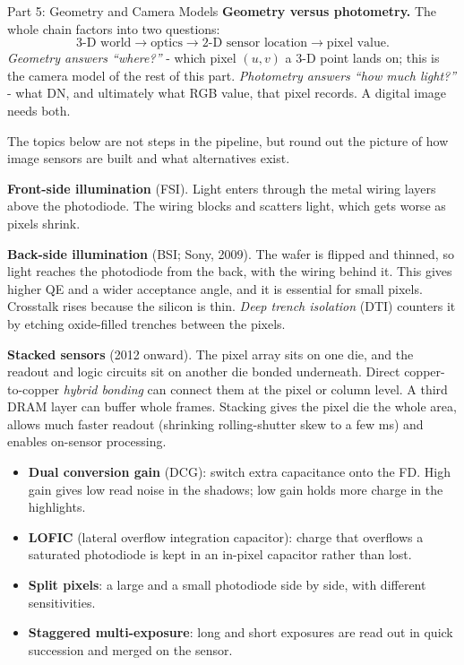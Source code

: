 \documentclass[letterpaper]{article}
\begin{document}
\begin{notes}{Part 5: Geometry and Camera Models}
\textbf{Geometry versus photometry.} The whole chain factors into two questions:
$$\text{3-D world}\to\text{optics}\to\text{2-D sensor location}\to\text{pixel value}.$$
\emph{Geometry answers ``where?''} - which pixel $(u,v)$ a 3-D point lands on; this is the camera model of the rest of this part. \emph{Photometry answers ``how much light?''} - what DN, and ultimately what RGB value, that pixel records. A digital image needs both.


The topics below are not steps in the pipeline, but round out the picture of how image sensors are built and what alternatives exist.


\textbf{Front-side illumination} (FSI). Light enters through the metal wiring layers above the photodiode. The wiring blocks and scatters light, which gets worse as pixels shrink.

\textbf{Back-side illumination} (BSI; Sony, 2009). The wafer is flipped and thinned, so light reaches the photodiode from the back, with the wiring behind it. This gives higher QE and a wider acceptance angle, and it is essential for small pixels. Crosstalk rises because the silicon is thin. \emph{Deep trench isolation} (DTI) counters it by etching oxide-filled trenches between the pixels.

\textbf{Stacked sensors} (2012 onward). The pixel array sits on one die, and the readout and logic circuits sit on another die bonded underneath. Direct copper-to-copper \emph{hybrid bonding} can connect them at the pixel or column level. A third DRAM layer can buffer whole frames. Stacking gives the pixel die the whole area, allows much faster readout (shrinking rolling-shutter skew to a few ms) and enables on-sensor processing.


\begin{itemize}[noitemsep]
    \item \textbf{Dual conversion gain} (DCG): switch extra capacitance onto the FD. High gain gives low read noise in the shadows; low gain holds more charge in the highlights.
    \item \textbf{LOFIC} (lateral overflow integration capacitor): charge that overflows a saturated photodiode is kept in an in-pixel capacitor rather than lost.
    \item \textbf{Split pixels}: a large and a small photodiode side by side, with different sensitivities.
    \item \textbf{Staggered multi-exposure}: long and short exposures are read out in quick succession and merged on the sensor.
\end{itemize}


\end{notes}
\end{document}
